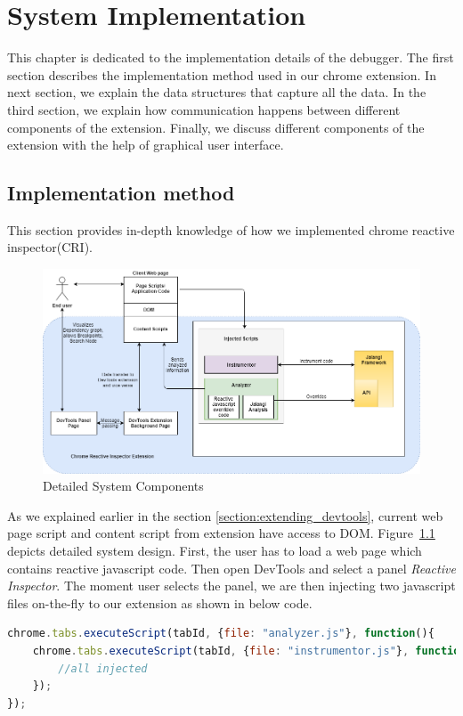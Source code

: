 \chapter{System Implementation} \label{chap:Implementation}
This chapter is dedicated to the implementation details of the debugger. The first section describes the implementation method used in our chrome extension. In next section, we explain the data structures that capture all the data. In the third section, we explain how communication happens between different components of the extension. Finally, we discuss different components of the extension with the help of graphical user interface.

\section{Implementation method}
This section provides in-depth knowledge of how we implemented chrome reactive inspector(CRI).

 
\begin{figure}[!h]
	\centering
	\includegraphics[scale=0.5,trim=0 0 0 0]{images/detailed-system-implementation.png}
	\caption{Detailed System Components}
	\label{fig:detailed-system-implementation}
\end{figure}
As we explained earlier in the section \ref{section:extending_devtools}, current web page script and content script from extension have access to DOM. Figure~\ref{fig:detailed-system-implementation} depicts detailed system design. First, the user has to load a web page which contains reactive javascript code. Then open DevTools and select a panel \textit{Reactive Inspector}. The moment user selects the panel, we are then injecting two javascript files on-the-fly to our extension as shown in below code.


\begin{lstlisting}[language=JavaScript, caption=Injecting Javascript Files, label={lst:inject-javascript-files}]
chrome.tabs.executeScript(tabId, {file: "analyzer.js"}, function(){
	chrome.tabs.executeScript(tabId, {file: "instrumentor.js"}, function(){
		//all injected
	});
});
\end{lstlisting}

